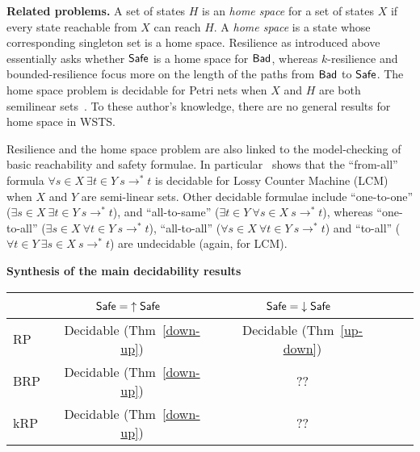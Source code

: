 {\bf Related problems.} 
A set of states $H$ is an {\em home space} for a set of states $X$ if every state reachable from $X$ can reach $H$. A {\em home space} is a state whose corresponding singleton set is a home space. Resilience as introduced above essentially asks whether $\textsf{Safe}$ is a home space for $\textsf{Bad}$, whereas $k$-resilience and bounded-resilience focus more on the length of the paths from $\textsf{Bad}$ to $\textsf{Safe}$. The home space problem is decidable for
Petri nets when $X$ and $H$ are both semilinear sets~\cite{DBLP:journals/corr/abs-2207-02697}.
To these author's knowledge, there are no general results for home space in WSTS.

Resilience and the home space problem are also linked to the 
model-checking of basic reachability and safety formulae. 
In particular~\cite{DBLP:conf/rp/Schnoebelen10} shows that the ``from-all'' formula $\forall s \in X~ \exists t \in Y~ s \to^* t$
is decidable for Lossy Counter Machine (LCM)
when $X$ and $Y$ are semi-linear sets.
Other decidable formulae include ``one-to-one'' ($\exists s \in  X ~ \exists t \in  Y ~ s \to^* 
 t$), and ``all-to-same'' ($\exists t \in  Y ~ \forall s \in  X ~ s \to^*  t$),
whereas ``one-to-all'' ($\exists s \in  X ~ \forall t \in  Y ~ s \to^*  t$), 
``all-to-all'' ($\forall s \in  X ~ \forall t \in  Y ~ s \to^*  t$)
  and ``to-all'' ($\forall t \in  Y  ~ \exists s \in  X ~ s \to^*  t$) are undecidable (again, for LCM). 
  
  
  





{\bf Synthesis of the main decidability results}\label{synthesis}
\begin{center}
\begin{tabular}{ | l | c | c | c | r |}
\hline   \ %
		& $\textsf{Safe} = {\uparrow \textsf{Safe}}$~ 
		 & $\textsf{Safe} = {\downarrow \textsf{Safe}}$~ 
 \\ \hline
   RP %
   	& Decidable (Thm~\ref{down-up})  
   		 & Decidable (Thm~\ref{up-down}) 
    \\ \hline
   BRP %
   &  Decidable (Thm~\ref{down-up}) 
   		 & ?? 
    \\ \hline
      kRP %
      & Decidable (Thm~\ref{down-up}) 
      		& ?? 
       \\ \hline
 \end{tabular}
\end{center}



